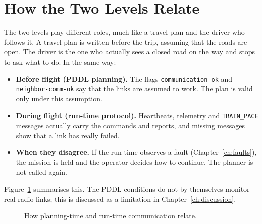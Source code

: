 \documentclass[11pt,a4paper,oneside]{report}
\newcommand{\code}[1]{\texttt{#1}}
\begin{document}
\section{How the Two Levels Relate}
The two levels play different roles, much like a travel plan and the driver who follows it. A
travel plan is written before the trip, assuming that the roads are open. The driver is the one
who actually sees a closed road on the way and stops to ask what to do. In the same way:
\begin{itemize}
  \item \textbf{Before flight (PDDL planning).} The flags \code{communication-ok} and
        \code{neighbor-comm-ok} say that the links are assumed to work. The plan is valid only
        under this assumption.
  \item \textbf{During flight (run-time protocol).} Heartbeats, telemetry and \code{TRAIN\_PACE}
        messages actually carry the commands and reports, and missing messages show that a link
        has really failed.
  \item \textbf{When they disagree.} If the run time observes a fault (Chapter~\ref{ch:faults}),
        the mission is held and the operator decides how to continue. The planner is not called
        again.
\end{itemize}
Figure~\ref{fig:twolevels} summarises this. The PDDL conditions do not by themselves monitor real
radio links; this is discussed as a limitation in Chapter~\ref{ch:discussion}.

\begin{figure}[!htb]
\centering
{}
\caption[Planning-time and run-time communication]{How planning-time and run-time communication
relate.}
\label{fig:twolevels}
\end{figure}
\end{document}
